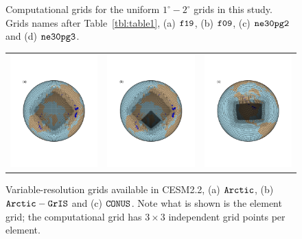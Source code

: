 \documentclass[draft]{agujournal2019}
\begin{document}
\begin{figure}[t]
\begin{center}
\begin{tabular}{cc}
\end{tabular}
\end{center}
\caption{Computational grids for the uniform $1^{\circ}-2^{\circ}$ grids in this study. Grids names after Table~\ref{tbl:table1}, (a) $\tt f19$, (b) $\tt f09$, (c) $\tt ne30pg2$ and (d) $\tt ne30pg3$.}
\label{fig:uni-grids}
\end{figure}

\begin{figure}[t]
\begin{center}
\begin{tabular}{ccc}
         \includegraphics[width=40mm]{figs/grid-ARCTIC.pdf}&
         \includegraphics[width=40mm]{figs/grid-ARCTICGRIS.pdf}&
         \includegraphics[width=40mm]{figs/grid-CONUS.pdf} \\
\end{tabular}
\end{center}
\caption{Variable-resolution grids available in CESM2.2, (a) $\tt Arctic$, (b) $\tt Arctic-GrIS$ and (c) $\tt CONUS$. Note what is shown is the element grid; the computational grid has $3\times3$ independent grid points per element.}
\label{fig:vr-grids}
\end{figure}
\end{document}
